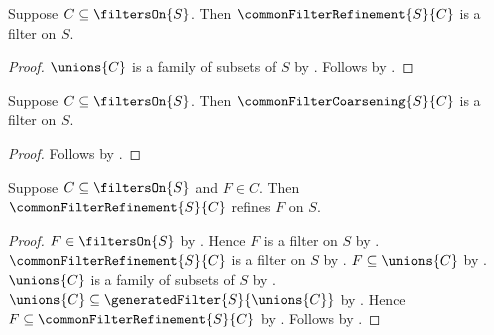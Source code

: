 \begin{classification}\label{common_filter_refinement_is_filter}
    Suppose $C\subseteq\filtersOn{S}$.
    Then $\commonFilterRefinement{S}{C}$ is a filter on $S$.
\end{classification}
\begin{proof}
    $\unions{C}$ is a family of subsets of $S$ by
        .
    Follows by .
\end{proof}

\begin{classification}\label{common_filter_coarsening_is_filter}
    Suppose $C\subseteq\filtersOn{S}$.
    Then $\commonFilterCoarsening{S}{C}$ is a filter on $S$.
\end{classification}
\begin{proof}
    Follows by
        .
\end{proof}

\begin{theorem}\label{common_filter_refinement_refines_members}
    Suppose $C\subseteq\filtersOn{S}$ and $F\in C$.
    Then $\commonFilterRefinement{S}{C}$ refines $F$ on $S$.
\end{theorem}
\begin{proof}
    $F\in\filtersOn{S}$ by .
    Hence $F$ is a filter on $S$ by .
    $\commonFilterRefinement{S}{C}$ is a filter on $S$ by
        .
    $F\subseteq\unions{C}$ by .
    $\unions{C}$ is a family of subsets of $S$ by
        .
    $\unions{C}\subseteq\generatedFilter{S}{\unions{C}}$ by
        .
    Hence $F\subseteq\commonFilterRefinement{S}{C}$ by
        .
    Follows by .
\end{proof}

